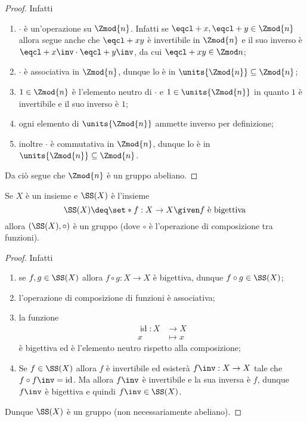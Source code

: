 \begin{proof}
    Infatti \begin{enumerate}[label={(G\arabic*)}, start=0]
        \item $\cdot$ è un'operazione su $\Zmod{n}$. Infatti se $\eqcl+ x, \eqcl+ y \in \Zmod{n}$ allora segue anche che $\eqcl+{xy}$ è invertibile in $\Zmod{n}$ e il suo inverso è $\eqcl+{x\inv} \cdot \eqcl+{y\inv}$, da cui $\eqcl+{xy} \in \Zmod n$;
        \item $\cdot$ è associativa in $\Zmod{n}$, dunque lo è in $\units{\Zmod{n}} \subseteq \Zmod{n}$;
        \item $1 \in \Zmod{n}$ è l'elemento neutro di $\cdot$ e $1 \in \units{\Zmod{n}}$ in quanto $1$ è invertibile e il suo inverso è $1$;
        \item ogni elemento di $\units{\Zmod{n}}$ ammette inverso per definizione;
        \item inoltre $\cdot$ è commutativa in $\Zmod{n}$, dunque lo è in $\units{\Zmod{n}} \subseteq \Zmod{n}$.
    \end{enumerate}
    Da ciò segue che $\Zmod{n}$ è un gruppo abeliano.
\end{proof}
\begin{example}
    Se $X$ è un insieme e $\SS(X)$ è l'insieme \[
        \SS(X) \deq \set*{f : X \to X \given f \text{ è bigettiva}}    
    \] allora $(\SS(X), \circ)$ è un gruppo (dove $\circ$ è l'operazione di composizione tra funzioni).
\end{example}
\begin{proof}
    Infatti \begin{enumerate}[label={(G\arabic*)}, start=0]
        \item se $f, g \in \SS(X)$ allora $f \circ g : X \to X$ è bigettiva, dunque $f \circ g \in \SS(X)$;
        \item l'operazione di composizione di funzioni è associativa;
        \item la funzione \begin{align*}
            \operatorname{id} : X &\to X\\
            x &\mapsto x
        \end{align*} è bigettiva ed è l'elemento neutro rispetto alla composizione;
        \item Se $f \in \SS(X)$ allora $f$ è invertibile ed esisterà $f\inv : X \to X$ tale che $f \circ f\inv = \operatorname{id}$. Ma allora $f\inv$ è invertibile e la sua inversa è $f$, dunque $f\inv$ è bigettiva e quindi $f\inv \in \SS(X)$.
    \end{enumerate}
    Dunque $\SS(X)$ è un gruppo (non necessariamente abeliano).
\end{proof}

